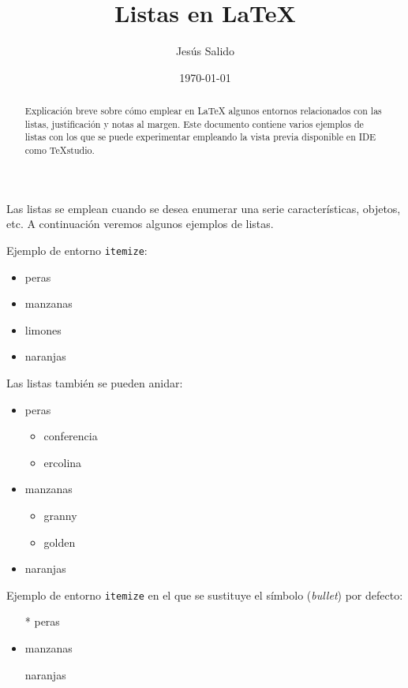 \documentclass[11pt,a4paper]{article}
\author{Jesús Salido}
\title{Listas en \LaTeX{}}
\date{\today}
\begin{document}
\maketitle

\begin{abstract}
	Explicación breve sobre cómo emplear en \LaTeX{} algunos entornos relacionados con las listas, justificación y notas al margen. Este documento contiene varios ejemplos de listas con los que se puede experimentar empleando la vista previa disponible en IDE como \TeX studio. 
\end{abstract}


Las listas se emplean cuando se desea enumerar una serie características, objetos, etc. A continuación veremos algunos ejemplos de listas.

\noindent Ejemplo de entorno {\tt itemize}:

\begin{itemize}
	\item peras
	\item manzanas
	\item limones
	\item naranjas
\end{itemize}


Las listas también se pueden anidar:
\begin{itemize}
	\item peras
	\begin{itemize}
		\item conferencia
		\item ercolina
	\end{itemize}
	\item manzanas
	\begin{itemize}
		\item granny
		\item golden 
	\end{itemize}
	\item naranjas
\end{itemize}



\noindent Ejemplo de entorno {\tt itemize} en el que se sustituye el símbolo (\emph{bullet}) por defecto:

\begin{itemize}
	\item[*] peras
	\item manzanas
	\item[\ding{170}] naranjas
\end{itemize}
\end{document}
